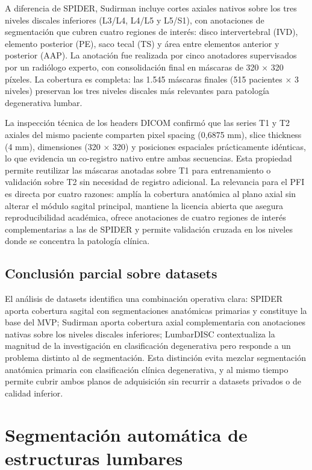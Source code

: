 A diferencia de SPIDER, Sudirman incluye cortes axiales nativos sobre los tres niveles discales inferiores (L3/L4, L4/L5 y L5/S1), con anotaciones de segmentación que cubren cuatro regiones de interés: disco intervertebral (IVD), elemento posterior (PE), saco tecal (TS) y área entre elementos anterior y posterior (AAP). La anotación fue realizada por cinco anotadores supervisados por un radiólogo experto, con consolidación final en máscaras de 320 × 320 píxeles. La cobertura es completa: las 1.545 máscaras finales (515 pacientes × 3 niveles) preservan los tres niveles discales más relevantes para patología degenerativa lumbar.

La inspección técnica de los headers DICOM confirmó que las series T1 y T2 axiales del mismo paciente comparten pixel spacing (0,6875 mm), slice thickness (4 mm), dimensiones (320 × 320) y posiciones espaciales prácticamente idénticas, lo que evidencia un co-registro nativo entre ambas secuencias. Esta propiedad permite reutilizar las máscaras anotadas sobre T1 para entrenamiento o validación sobre T2 sin necesidad de registro adicional. La relevancia para el PFI es directa por cuatro razones: amplía la cobertura anatómica al plano axial sin alterar el módulo sagital principal, mantiene la licencia abierta que asegura reproducibilidad académica, ofrece anotaciones de cuatro regiones de interés complementarias a las de SPIDER y permite validación cruzada en los niveles donde se concentra la patología clínica.

\subsection{Conclusión parcial sobre datasets}

El análisis de datasets identifica una combinación operativa clara: SPIDER aporta cobertura sagital con segmentaciones anatómicas primarias y constituye la base del MVP; Sudirman aporta cobertura axial complementaria con anotaciones nativas sobre los niveles discales inferiores; LumbarDISC contextualiza la magnitud de la investigación en clasificación degenerativa pero responde a un problema distinto al de segmentación. Esta distinción evita mezclar segmentación anatómica primaria con clasificación clínica degenerativa, y al mismo tiempo permite cubrir ambos planos de adquisición sin recurrir a datasets privados o de calidad inferior.

\section{Segmentación automática de estructuras lumbares}

